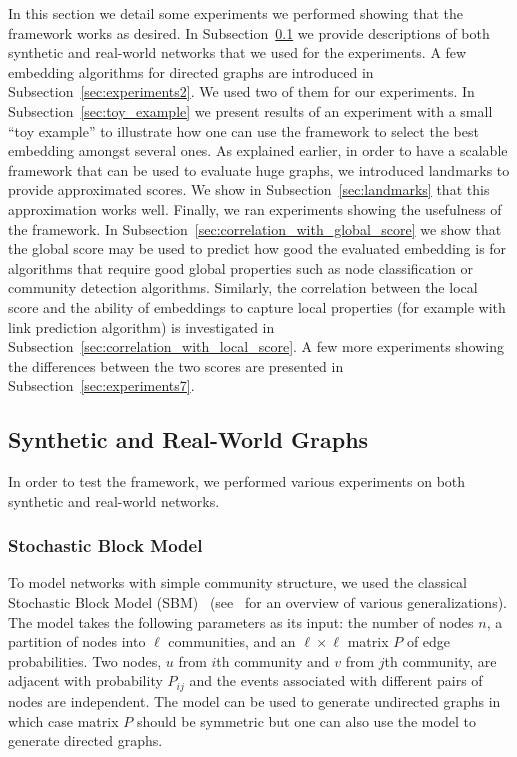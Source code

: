 \documentclass[11pt]{article}
\begin{document}
In this section we detail some experiments we performed showing that the framework works as desired. In Subsection~\ref{sec:experiment1} we provide descriptions of  both synthetic and real-world networks that we used for the experiments. A few embedding algorithms for directed graphs are introduced in Subsection~\ref{sec:experiments2}. We used two of them for our experiments. In Subsection~\ref{sec:toy_example} we present results of an experiment with a small ``toy example'' to illustrate how one can use the framework to select the best embedding amongst several ones. As explained earlier, in order to have a scalable framework that can be used to evaluate huge graphs, we introduced landmarks to provide approximated scores. We show in Subsection~\ref{sec:landmarks} that this approximation works well. 
Finally, we ran experiments showing the usefulness of the framework. In Subsection~\ref{sec:correlation_with_global_score} we show that the global score may be used to predict how good the evaluated embedding is for algorithms that require good global properties such as node classification or community detection algorithms. Similarly, the correlation between the local score and the ability of embeddings to capture local properties (for example with link prediction algorithm) is investigated in Subsection~\ref{sec:correlation_with_local_score}. A few more experiments showing the differences between the two scores are presented in Subsection~\ref{sec:experiments7}.

\subsection{Synthetic and Real-World Graphs}\label{sec:experiment1}

In order to test the framework, we performed various experiments on both synthetic and real-world networks. 

\subsubsection{Stochastic Block Model}

To model networks with simple community structure, we used the classical Stochastic Block Model (SBM)~\cite{holland1983stochastic} (see~\cite{funke2019stochastic} for an overview of various generalizations). The model takes the following parameters as its input: the number of nodes $n$, a partition of nodes into $\ell$ communities, and an $\ell \times \ell$ matrix $P$ of edge probabilities. Two nodes, $u$ from $i$th community and $v$ from $j$th community, are adjacent with probability $P_{ij}$ and the events associated with different pairs of nodes are independent. The model can be used to generate undirected graphs in which case matrix $P$ should be symmetric but one can also use the model to generate directed graphs. 
\end{document}
